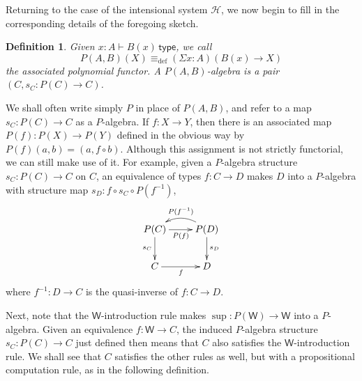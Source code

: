 \documentclass[10pt,a4paper,oneside,reqno]{amsart}
\numberwithin{equation}{section}
\theoremstyle{mythm}
\theoremstyle{mydef}
\newtheorem{definition}[theorem]{Definition}
\theoremstyle{myrmk}
\newtheorem{remark}[theorem]{Remark}
\newcommand{\deq}{\equiv}
\newcommand{\defeq}{\deq_{\mathrm{def}}}
\newcommand{\Hint}{\mathcal{H}}
\newcommand{\type}{\mathsf{type}}
\newcommand{\W}{\mathsf{W}}
\newcommand{\Bool}{\mathsf{Bool}}
\begin{document}

Returning to the case of the intensional system $\Hint$, we now begin to fill in the corresponding details of the foregoing sketch.

\begin{definition}
Given $x:A \vdash B(x)\, \type$, we call $$P(A,B)(X) \defeq (\Sigma x:A) (B(x)\to X)$$ the associated \emph{polynomial functor}.  A \emph{$P(A,B)$-algebra} is a pair $(C, s_C: P(C) \to C)$.    
\end{definition}

We shall often write simply $P$ in place of $P(A,B)$, and refer to a map $s_C : P(C)\to C$ as a $P$-algebra.  
If $f : X\to Y$, then there is an associated map $P(f) : P(X)\to P(Y)$ defined in the obvious way by $P(f)(a, b) = (a,f\circ b)
$.  Although this assignment is not strictly functorial, we can still make use of it. For example, given a $P$-algebra structure $s_C :P(C)\to C$ on $C$, an equivalence of types $f : C \to D$ makes $D$ into a $P$-algebra with structure map $s_D : f\circ s_C\circ P(f^{-1})$,
  \[
\xymatrix{
P(C) \ar[d]_{s_C} \ar[r]_{P(f)} & \ar@/_1pc/[l]_{P(f^{-1})} P(D)  \ar[d]^{s_D}  \\
 C  \ar[r]_{f} & D
 }
 \]
 where $f^{-1} : D\to C$ is the quasi-inverse of $f : C\to D$.


 
Next, note that the $\W$-introduction rule makes $\sup : P(\W)\to \W$ into a $P$-algebra.  Given an equivalence  $f : \W \to C$, the induced $P$-algebra structure $s_C:P(C)\to C$ just defined then means that $C$ also satisfies the $\W$-introduction rule.  We shall see that $C$ satisfies the other rules as well, but with a propositional computation rule, as in the following definition.
\end{document}
